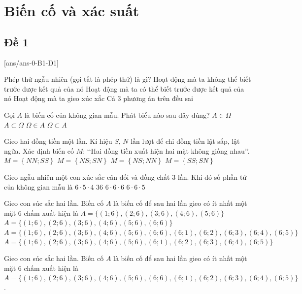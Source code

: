 \section{Biến cố và xác suất}

\subsection{Đề 1}
[ans/ans-0-B1-D1]
\caulc
\begin{ex}%
Phép thử ngẫu nhiên (gọi tắt là phép thử) là gì?
	\choice
	{\True Hoạt động mà ta không thể biết trước được kết quả của nó}
	{Hoạt động mà ta có thể biết trước được kết quả của nó}
	{Hoạt động mà ta gieo xúc xắc}
	{Cả 3 phương án trên đều sai}
\end{ex}
\begin{ex}%
	Gọi $A$ là biến cố của không gian mẫu. Phát biểu nào sau đây đúng?
	\choice
	{$A\in \Omega$}
	{\True $A \subset \Omega$}
	{$\Omega \in A$}
	{$\Omega \subset A$}
\end{ex}

\begin{ex}%
Gieo hai đồng tiền một lần. Kí hiệu $S$, $N$ lần lượt để chỉ đồng tiền lật
	sấp, lật ngửa. Xác định biến cố $M$: \lq\lq Hai đồng tiền xuất hiện hai mặt không giống nhau\rq\rq.
	\choice
	{$M = \left\{NN; SS\right\}$}
	{\True $M = \left\{NS; SN\right\}$}
	{$M = \left\{NS; NN\right\}$}
	{$M = \left\{SS; SN\right\}$}
	\end{ex}

\begin{ex}%
	Gieo ngẫu nhiên một con xúc sắc cân đối và đồng chất $3$ lần. Khi đó số phần tử của không gian mẫu là
	\choice
	{$6\cdot 5\cdot 4$}
	{$36$}
	{\True $6\cdot 6\cdot 6$}
	{$6\cdot 6\cdot 5$}
\end{ex}

\begin{ex}%
	Gieo con súc sắc hai lần. Biến cố $A$ là biến cố để sau hai lần gieo có ít nhất một mặt $6$ chấm xuất hiện là
	\choice
	{$A=\{(1;6),(2;6),(3;6),(4;6),(5;6)\}$}
	{$A=\{(1;6),(2;6),(3;6),(4;6),(5;6),(6;6)\}$}
	{\True $A=\{(1;6),(2;6),(3;6),(4;6),(5;6),(6;6),(6;1),(6;2),(6;3),(6;4),(6;5)\}$}
	{$A=\{(1;6),(2;6),(3;6),(4;6),(5;6),(6;1),(6;2),(6;3),(6;4),(6;5)\}$}
	\loigiai
	{ Gieo con súc sắc hai lần. Biến cố $A$ là biến cố để sau hai lần gieo có ít nhất một mặt $6$ chấm xuất hiện là  $A=\{(1;6),(2;6),(3;6),(4;6),(5;6),(6;6),(6;1),(6;2),(6;3),(6;4),(6;5)\}$.
		
	}
\end{ex}


